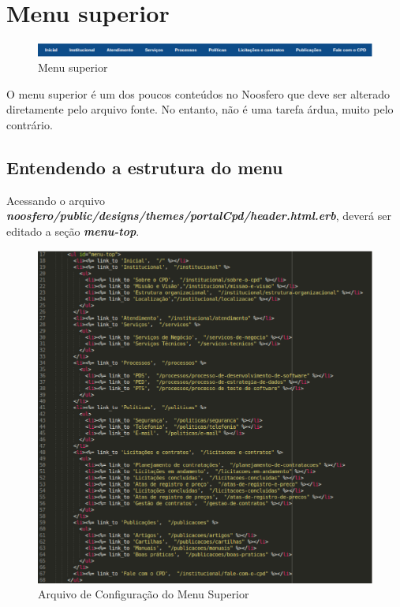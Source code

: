 \newpage
\section{Menu superior}
\label{menuSuperior}
\begin{figure}[h]
     \centering
       \includegraphics[keepaspectratio=true,scale=0.49]{figuras/menu_superior}
     \caption{Menu superior}
\end{figure}

O menu superior é um dos poucos conteúdos no Noosfero que deve ser alterado 
diretamente pelo arquivo fonte. No entanto, não é uma tarefa árdua, muito pelo
contrário.

\newpage
\subsection{Entendendo a estrutura do menu}

Acessando o arquivo \emph{\textbf{noosfero/public/designs/themes/portalCpd/header.html.erb}},
deverá ser editado a seção \emph {\textbf{menu-top}}.

\begin{figure}[h]
     \centering
       \includegraphics[scale=0.5]{figuras/menu-top}
     \caption{Arquivo de Configuração do Menu Superior}
     \label{fig:configMenuSuperior}
\end{figure}

